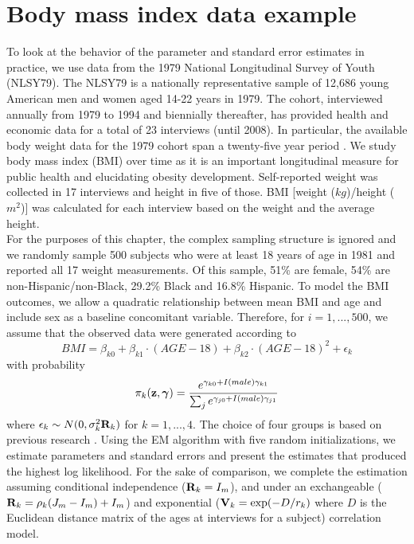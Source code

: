 \section{Body mass index data example}
To look at the behavior of the parameter and standard error estimates in practice, we use data from the 1979 National Longitudinal Survey of Youth (NLSY79). The NLSY79 is a nationally representative sample of 12,686 young American men and women aged 14-22 years in 1979. The cohort, interviewed annually from 1979 to 1994 and biennially thereafter, has provided health and economic data for a total of 23 interviews (until 2008).  In particular, the available body weight data for the 1979 cohort span a twenty-five year period \cite{ostbye2011}. We study body mass index (BMI) over time as it is an important longitudinal measure for public health and elucidating obesity development.  Self-reported weight was collected in 17 interviews and height in five of those. BMI [weight ($kg$)/height ($m^{2}$)] was calculated for each interview based on the weight and the average height.\\

For the purposes of this chapter, the complex sampling structure is ignored and we randomly sample 500 subjects who were at least 18 years of age in 1981 and reported all 17 weight measurements. Of this sample, 51\% are female, 54\% are non-Hispanic/non-Black, 29.2\% Black and 16.8\% Hispanic. To model the BMI outcomes, we allow a quadratic relationship between mean BMI and age and include sex as a baseline concomitant variable. Therefore, for $i=1,...,500$, we assume that the observed data were generated according to
$$BMI=\beta_{k0}+\beta_{k1}\cdot (AGE-18)+\beta_{k2}\cdot (AGE-18)^{2}+\epsilon_{k}$$
with probability
$$\pi_{k}(\mathbf z,\boldsymbol\gamma)=\frac{e^{\gamma_{k0}+I(male)\gamma_{k1}}}{\sum_{j}e^{\gamma_{j0}+I(male)\gamma_{j1}}}$$
where $\epsilon_{k}\sim N(0,\sigma_{k}^{2}\mathbf R_k)$
for $k=1,...,4$. The choice of four groups is based on previous research \cite{ostbye2011}. Using the EM algorithm with five random initializations, we estimate parameters and standard errors and present the estimates that produced the highest log likelihood. For the sake of comparison, we complete the estimation assuming conditional independence ($\mathbf R_k  = I_m$), and under an exchangeable ($\mathbf R_k = \rho_k(J_m - I_m)+I_m$) and exponential ($\mathbf V_k = \exp(-D/r_k)$ where $D$ is the Euclidean distance matrix of the ages at interviews for a subject) correlation model.
